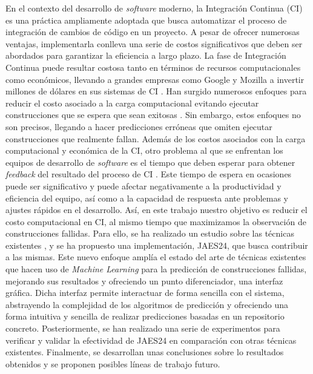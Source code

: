 En el contexto del desarrollo de \textit{software} moderno, la Integración Continua (CI) es
una práctica ampliamente adoptada que busca automatizar el proceso de integración de cambios de
código en un proyecto. A pesar de ofrecer numerosas ventajas, implementarla conlleva una serie de
costos significativos que deben ser abordados para garantizar la eficiencia a largo plazo. La fase
de Integración Continua puede resultar costosa tanto en términos de recursos computacionales como
económicos, llevando a grandes empresas como Google y Mozilla a invertir millones de dólares en
sus sistemas de CI \cite{1}. Han surgido numerosos enfoques para reducir el costo asociado
a la carga computacional evitando ejecutar construcciones que se espera que sean exitosas
\cite{2}. Sin embargo, estos enfoques no son precisos, llegando a  hacer predicciones erróneas que
omiten ejecutar construcciones que realmente fallan. Además de los costos asociados con la carga
computacional y económica de la CI, otro problema al que se enfrentan los equipos de
desarrollo de \textit{software} es el tiempo que deben esperar para obtener \textit{feedback} del
resultado del proceso de CI \cite{3}. Este tiempo de espera en ocasiones puede ser
significativo y puede afectar negativamente a la productividad y eficiencia del equipo, así como
a la capacidad de respuesta ante problemas y ajustes rápidos en el desarrollo. Así, en este
trabajo nuestro objetivo es reducir el costo computacional en CI, al mismo tiempo que
maximizamos la observación de construcciones fallidas. Para ello, se ha realizado un estudio
sobre las técnicas existentes \cite{2,4,5,6,7,8}, y se ha propuesto una implementación,
JAES24, que busca contribuir a las mismas. Este nuevo enfoque amplía el estado del arte
de técnicas existentes que hacen uso de \textit{Machine Learning} para la predicción de construcciones
fallidas, mejorando sus resultados y ofreciendo un punto diferenciador, una interfaz gráfica. Dicha
interfaz permite interactuar de forma sencilla con el sistema, abstrayendo la complejidad de los
algoritmos de predicción y ofreciendo una forma intuitiva y sencilla de realizar predicciones basadas
en un repositorio concreto. Posteriormente, se han realizado una serie de experimentos para verificar
y validar la efectividad de JAES24 en comparación con otras técnicas existentes. Finalmente,
se desarrollan unas conclusiones sobre lo resultados obtenidos y se proponen posibles líneas de
trabajo futuro.

\vspace{0.5cm}

